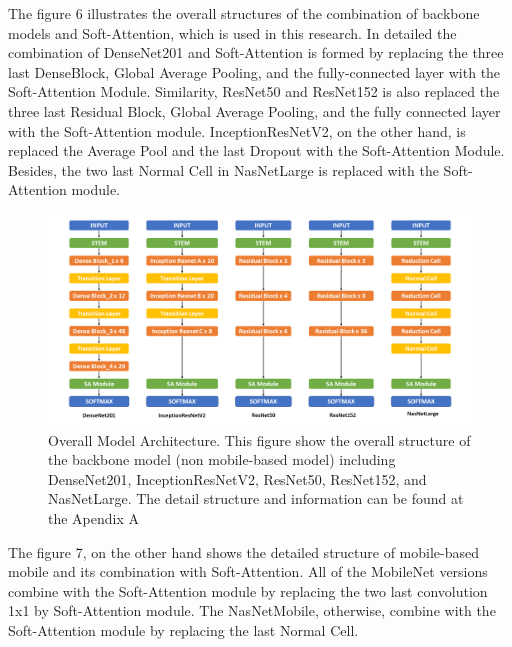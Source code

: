 \documentclass[sensors,article,submit,pdftex,moreauthors]{Definitions/mdpi}
\begin{document}
The figure 6 illustrates the overall structures of the combination of backbone models and Soft-Attention, which is used in this research. In detailed the combination of DenseNet201 and Soft-Attention is formed by replacing the three last DenseBlock, Global Average Pooling, and the fully-connected layer with the Soft-Attention Module. Similarity, ResNet50 and ResNet152 is also replaced the three last Residual Block, Global Average Pooling, and the fully connected layer with the Soft-Attention module. InceptionResNetV2, on the other hand, is replaced the Average Pool and the last Dropout with the Soft-Attention Module. Besides, the two last Normal Cell in NasNetLarge is replaced with the Soft-Attention module. 
\begin{figure}[H]
	\centering
	\includegraphics[width=1\linewidth]{Definitions/Model Structure}
	\caption{Overall Model Architecture. This figure show the overall structure of the backbone model (non mobile-based model) including DenseNet201, InceptionResNetV2, ResNet50, ResNet152, and NasNetLarge. The detail structure and information can be found at the Apendix A}
	\label{fig:model-structure}
\end{figure}
The figure 7, on the other hand shows the detailed structure of mobile-based mobile and its combination with Soft-Attention. All of the MobileNet versions combine with the Soft-Attention module by replacing the two last convolution 1x1 by Soft-Attention module. The NasNetMobile, otherwise, combine with the Soft-Attention module by replacing the last Normal Cell. 
\end{document}
